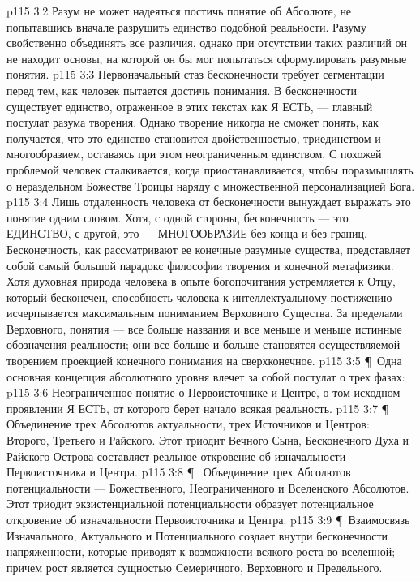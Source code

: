 \vs p115 3:2 Разум не может надеяться постичь понятие об Абсолюте, не попытавшись вначале разрушить единство подобной реальности. Разуму свойственно объединять все различия, однако при отсутствии таких различий он не находит основы, на которой он бы мог попытаться сформулировать разумные понятия.
\vs p115 3:3 Первоначальный стаз бесконечности требует сегментации перед тем, как человек пытается достичь понимания. В бесконечности существует единство, отраженное в этих текстах как Я ЕСТЬ, --- главный постулат разума творения. Однако творение никогда не сможет понять, как получается, что это единство становится двойственностью, триединством и многообразием, оставаясь при этом неограниченным единством. С похожей проблемой человек сталкивается, когда приостанавливается, чтобы поразмышлять о нераздельном Божестве Троицы наряду с множественной персонализацией Бога.
\vs p115 3:4 Лишь отдаленность человека от бесконечности вынуждает выражать это понятие одним словом. Хотя, с одной стороны, бесконечность --- это ЕДИНСТВО, с другой, это --- МНОГООБРАЗИЕ без конца и без границ. Бесконечность, как рассматривают ее конечные разумные существа, представляет собой самый большой парадокс философии творения и конечной метафизики. Хотя духовная природа человека в опыте богопочитания устремляется к Отцу, который бесконечен, способность человека к интеллектуальному постижению исчерпывается максимальным пониманием Верховного Существа. За пределами Верховного, понятия --- все больше названия и все меньше и меньше истинные обозначения реальности; они все больше и больше становятся осуществляемой творением проекцией конечного понимания на сверхконечное.
\vs p115 3:5 \P\ Одна основная концепция абсолютного уровня влечет за собой постулат о трех фазах:
\vs p115 3:6 \bibnobreakspace {} Неограниченное понятие о Первоисточнике и Центре, о том исходном проявлении Я ЕСТЬ, от которого берет начало всякая реальность.
\vs p115 3:7 \P\ \bibnobreakspace {} Объединение трех Абсолютов актуальности, трех Источников и Центров: Второго, Третьего и Райского. Этот триодит Вечного Сына, Бесконечного Духа и Райского Острова составляет реальное откровение об изначальности Первоисточника и Центра.
\vs p115 3:8 \P\ \bibnobreakspace {} Объединение трех Абсолютов потенциальности --- Божественного, Неограниченного и Вселенского Абсолютов. Этот триодит экзистенциальной потенциальности образует потенциальное откровение об изначальности Первоисточника и Центра.
\vs p115 3:9 \P\ Взаимосвязь Изначального, Актуального и Потенциального создает внутри бесконечности напряженности, которые приводят к возможности всякого роста во вселенной; причем рост является сущностью Семеричного, Верховного и Предельного.
